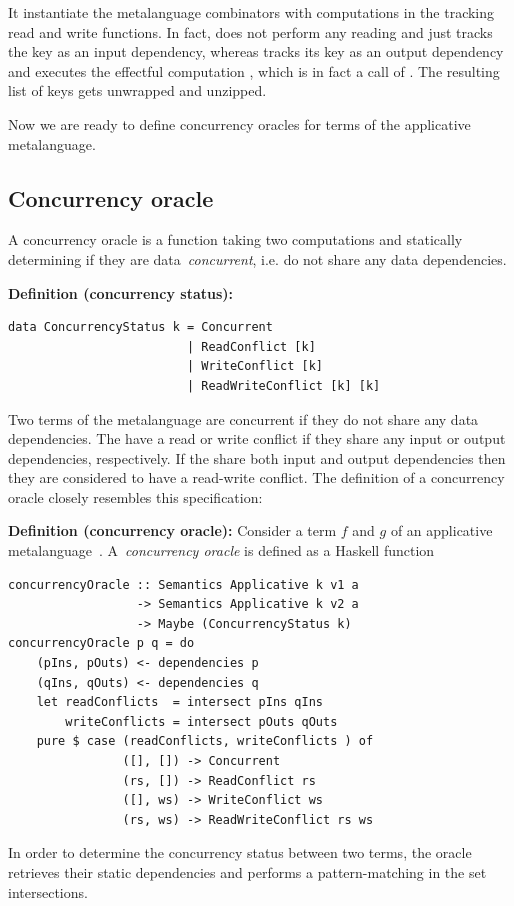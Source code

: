 It instantiate the metalanguage combinators with computations in the tracking read
and write functions. In fact,  does not perform any reading and just tracks
the key as an input dependency, whereas  tracks its key as
an output dependency and executes the effectful computation , which is
in fact a call of . The resulting list of keys gets unwrapped and
unzipped.

Now we are ready to define concurrency oracles for terms of the
applicative metalanguage.

\newpage
\subsection{Concurrency oracle}
A concurrency oracle is a function taking two computations and statically
determining if they are data~\emph{concurrent}, i.e. do not share any
data dependencies.


\textbf{Definition (concurrency status):\label{def:concurrency-status}}
\begin{verbatim}
data ConcurrencyStatus k = Concurrent
                         | ReadConflict [k]
                         | WriteConflict [k]
                         | ReadWriteConflict [k] [k]
\end{verbatim}

\noindent Two terms of the metalanguage are concurrent if they do not share any data dependencies.
The have a read or write conflict if they share any input or output dependencies,
respectively. If the share both input and output dependencies then they are considered to
have a read-write conflict. The definition of a concurrency oracle closely resembles
this specification:

\textbf{Definition (concurrency oracle):\label{def:oracle}}
Consider a term $f$ and $g$ of an applicative metalanguage~.
A~\emph{concurrency oracle} is defined as a Haskell function
\begin{verbatim}
concurrencyOracle :: Semantics Applicative k v1 a
                  -> Semantics Applicative k v2 a
                  -> Maybe (ConcurrencyStatus k)
concurrencyOracle p q = do
    (pIns, pOuts) <- dependencies p
    (qIns, qOuts) <- dependencies q
    let readConflicts  = intersect pIns qIns
        writeConflicts = intersect pOuts qOuts
    pure $ case (readConflicts, writeConflicts ) of
                ([], []) -> Concurrent
                (rs, []) -> ReadConflict rs
                ([], ws) -> WriteConflict ws
                (rs, ws) -> ReadWriteConflict rs ws

\end{verbatim}
In order to determine the concurrency status between two terms, the oracle
retrieves their static dependencies and performs a pattern-matching in the
set intersections.

